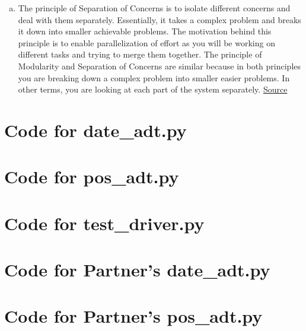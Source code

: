 \documentclass[12pt]{article}
\begin{document}
\begin{enumerate}[(a)]
\item The principle of Separation of Concerns is to isolate different concerns and deal with them separately. Essentially, it takes a complex problem and breaks it down into smaller achievable problems. The motivation behind this principle is to enable parallelization of effort as you will be working on different tasks and trying to merge them together. The principle of Modularity and Separation of Concerns are similar because in both principles you are breaking down a complex problem into smaller easier problems. In other terms, you are looking at each part of the system separately. \href{https://gitlab.cas.mcmaster.ca/smiths/se2aa4_cs2me3/blob/master/Lectures/L05_SoftEngPrinciples/SoftEngPrinciples.pdf}{Source} 

\end{enumerate}

\newpage

\lstset{language=Python, basicstyle=\tiny, breaklines=true, showspaces=false,
  showstringspaces=false, breakatwhitespace=true}

\def\thesection{\Alph{section}}

\section{Code for date\_adt.py}

\noindent 

\newpage

\section{Code for pos\_adt.py}

\noindent 

\newpage

\section{Code for test\_driver.py}

\noindent 

\newpage

\section{Code for Partner's date\_adt.py}

\noindent 

\newpage

\section{Code for Partner's pos\_adt.py}

\noindent 
\end{document}

